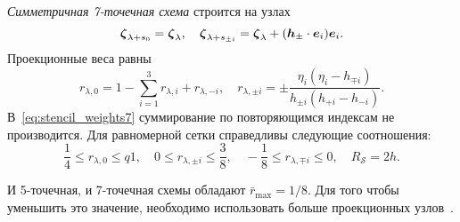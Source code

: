 \emph{Симметричная 7-точечная схема} строится на узлах
\begin{equation}\label{eq:stencil_nodes7}
    {\boldsymbol{\zeta}}_{\lambda+s_0} = {\boldsymbol{\zeta}}_{\lambda}, \quad
    {\boldsymbol{\zeta}}_{\lambda+s_{\pm i}} = {\boldsymbol{\zeta}}_{\lambda} + ({\boldsymbol{h}}_\pm\cdot \boldsymbol{e}_i)\boldsymbol{e}_i.
\end{equation}
Проекционные веса равны
\begin{equation}\label{eq:stencil_weights7}
    r_{\lambda,0} = 1 - \sum_{i=1}^3 r_{\lambda,i} + r_{\lambda,-i}, \quad
    r_{\lambda,\pm i} = \pm\frac{\eta_i(\eta_i - h_{\mp i})}{h_{\pm i}(h_{+i}-h_{-i})}.
\end{equation}
В~\eqref{eq:stencil_weights7} суммирование по повторяющимся индексам не производится.
Для равномерной сетки справедливы следующие соотношения:
\begin{equation}\label{eq:weights_ranges7}
    \frac14 \leq r_{\lambda,0} \le  q 1, \quad
    0 \leq r_{\lambda,\pm i} \leq \frac38, \quad
    -\frac18 \leq r_{\lambda,\mp i} \leq 0, \quad
    R_\mathcal{S} = 2h.
\end{equation}

И 5-точечная, и 7-точечная схемы обладают \(\bar{r}_{\max}=1/8\).
Для того чтобы уменьшить это значение, необходимо использовать больше проекционных узлов~\cite{Dodulad2012}.


\clearpage
